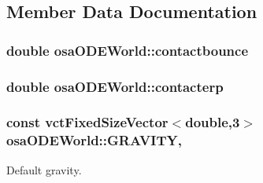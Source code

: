 \subsection{Member Data Documentation}
\hypertarget{classosa_o_d_e_world_a32473325798a042ba65d0bcf43b11860}{
\subsubsection[{contactbounce}]{\setlength{\rightskip}{0pt plus 5cm}double osa\-O\-D\-E\-World\-::contactbounce\hspace{0.3cm}{\ttfamily [protected]}}}\label{classosa_o_d_e_world_a32473325798a042ba65d0bcf43b11860}
\hypertarget{classosa_o_d_e_world_aade62058b4fd841e2d78cc9bdbf83b5d}{
\subsubsection[{contacterp}]{\setlength{\rightskip}{0pt plus 5cm}double osa\-O\-D\-E\-World\-::contacterp\hspace{0.3cm}{\ttfamily [protected]}}}\label{classosa_o_d_e_world_aade62058b4fd841e2d78cc9bdbf83b5d}
\hypertarget{classosa_o_d_e_world_ae1d291977a1d6305cea26a6bd87fa320}{
\subsubsection[{G\-R\-A\-V\-I\-T\-Y}]{\setlength{\rightskip}{0pt plus 5cm}const {\bf vct\-Fixed\-Size\-Vector}$<$double,3$>$ osa\-O\-D\-E\-World\-::\-G\-R\-A\-V\-I\-T\-Y\hspace{0.3cm}{\ttfamily [static]}, {\ttfamily [protected]}}}\label{classosa_o_d_e_world_ae1d291977a1d6305cea26a6bd87fa320}


Default gravity. 

